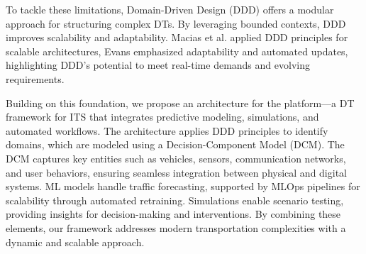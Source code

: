 To tackle these limitations, Domain-Driven Design (DDD) offers a modular approach for structuring complex DTs. By leveraging bounded contexts, DDD improves scalability and adaptability. Macias et al. \cite{macias2023architecting} applied DDD principles for scalable architectures, Evans \cite{evans2004domain} emphasized adaptability and automated updates, highlighting DDD's potential to meet real-time demands and evolving requirements.

Building on this foundation, we propose an architecture for the \digit platform—a DT framework for ITS that integrates predictive modeling, simulations, and automated workflows. The architecture applies DDD principles to identify domains, which are modeled using a Decision-Component Model (DCM). The DCM captures key entities such as vehicles, sensors, communication networks, and user behaviors, ensuring seamless integration between physical and digital systems. ML models handle traffic forecasting, supported by MLOps pipelines for scalability through automated retraining. Simulations enable scenario testing, providing insights for decision-making and interventions. By combining these elements, our framework addresses modern transportation complexities with a dynamic and scalable approach.